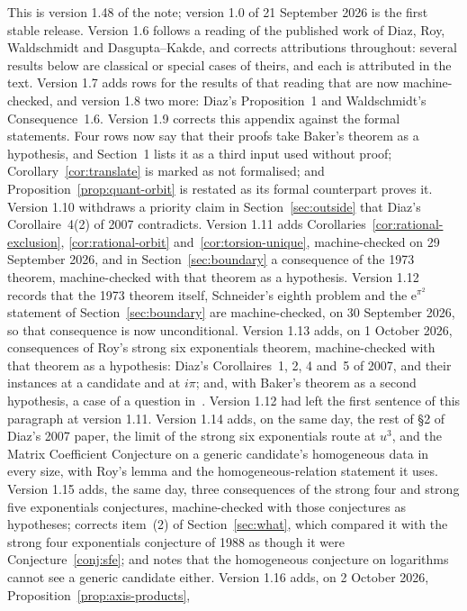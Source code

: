 \documentclass[11pt,a4paper]{article}
\theoremstyle{plain}
\theoremstyle{definition}
\newcommand{\e}{\mathrm{e}}
\begin{document}
This is version 1.48 of the note; version 1.0 of 21 September 2026 is the first stable release.
Version 1.6 follows a reading of the published work of Diaz, Roy, Waldschmidt and Dasgupta--Kakde,
and corrects attributions throughout: several results below are classical or special cases of
theirs, and each is attributed in the text. Version 1.7 adds rows for the results of that reading that are
now machine-checked, and version 1.8 two more: Diaz's Proposition~1 and Waldschmidt's Consequence~1.6.
Version 1.9 corrects this appendix against the formal statements. Four rows now say that their proofs
take Baker's theorem as a hypothesis, and Section~1 lists it as a third input used without proof;
Corollary~\ref{cor:translate} is marked as not formalised; and Proposition~\ref{prop:quant-orbit}
is restated as its formal counterpart proves it.
Version 1.10 withdraws a priority claim in Section~\ref{sec:outside} that Diaz's Corollaire~4(2)
of 2007 contradicts. Version 1.11 adds Corollaries~\ref{cor:rational-exclusion},
\ref{cor:rational-orbit} and~\ref{cor:torsion-unique}, machine-checked on 29 September 2026, and in
Section~\ref{sec:boundary} a consequence of the 1973 theorem, machine-checked with that theorem as a
hypothesis. Version 1.12 records that the 1973 theorem itself, Schneider's eighth problem and the
$\e^{\pi^{2}}$ statement of Section~\ref{sec:boundary} are machine-checked, on 30 September 2026, so
that consequence is now unconditional. Version 1.13 adds, on 1 October 2026, consequences of Roy's
strong six exponentials theorem, machine-checked with that theorem as a hypothesis: Diaz's
Corollaires~1, 2, 4 and~5 of 2007, and their instances at a candidate and at $i\pi$; and, with
Baker's theorem as a second hypothesis, a case of a question in~\cite[p.~399]{waldschmidt-book}.
Version 1.12 had left the first sentence of this paragraph at version 1.11. Version 1.14 adds, on the
same day, the rest of \S2 of Diaz's 2007 paper, the limit of the strong six exponentials route at
$u^{3}$, and the Matrix Coefficient Conjecture on a generic candidate's homogeneous data in every
size, with Roy's lemma and the homogeneous-relation statement it uses. Version 1.15 adds, the same
day, three consequences of the strong four and strong five exponentials conjectures, machine-checked
with those conjectures as hypotheses; corrects item~(2) of Section~\ref{sec:what}, which compared
it with the strong four exponentials conjecture of 1988 as though it were Conjecture~\ref{conj:sfe};
and notes that the homogeneous conjecture on logarithms cannot see a generic candidate either.
Version 1.16 adds, on 2 October 2026, Proposition~\ref{prop:axis-products},
\end{document}
